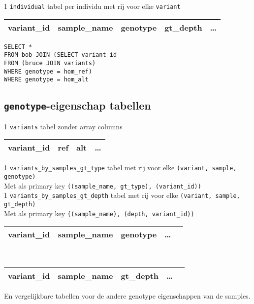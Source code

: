 \documentclass{article}
\begin{document}
1 \texttt{individual} tabel per individu met rij voor elke \texttt{variant}

\begin{table}[!htbp]
\begin{tabular}{@{}|l|l|l|l|l|@{}}
\toprule
variant\_id & sample\_name & genotype & gt\_depth & \ldots \\ \bottomrule
\end{tabular}
\end{table}

\begin{tabbing}
\texttt{SELECT *}
\\\texttt{FROM bob JOIN (}\=\texttt{SELECT variant\_id}
\\ \> \texttt{FROM (bruce JOIN variants)}
\\ \> \texttt{WHERE genotype = hom\_ref) }
\\ \texttt{WHERE genotype = hom\_alt }
\end{tabbing}

\newpage
\subsection{\texttt{genotype}-eigenschap tabellen}

1 \texttt{variants} tabel zonder array columns

\begin{table}[!htbp]
\begin{tabular}{@{}|l|l|l|l|@{}}
\toprule
variant\_id & ref & alt & \ldots \\ \bottomrule
\end{tabular}
\end{table}

1 \texttt{variants\_by\_samples\_gt\_type} tabel met rij voor elke \texttt{(variant, sample, genotype)}\\ Met als primary key \texttt{((sample\_name, gt\_type), (variant\_id))}\\

1 \texttt{variants\_by\_samples\_gt\_depth} tabel met rij voor elke \texttt{(variant, sample, gt\_depth)}\\ Met als primary key \texttt{((sample\_name), (depth, variant\_id))}\\


\begin{table}[!htbp]
\begin{tabular}{@{}|l|l|l|l|l|@{}}
\toprule
variant\_id & sample\_name & genotype & \ldots \\ \bottomrule
\end{tabular}\\
\begin{tabular}{@{}|l|l|l|l|l|@{}}
\toprule
variant\_id & sample\_name & gt\_depth & \ldots \\ \bottomrule
\end{tabular}
\end{table}
En vergelijkbare tabellen voor de andere genotype eigenschappen van de samples.
\end{document}

